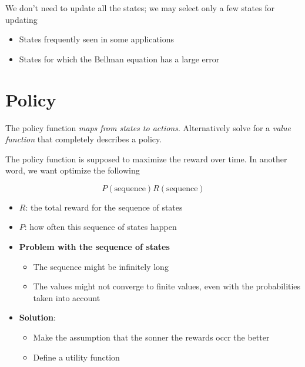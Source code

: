       We don't need to update all the states; we may select only a few states
      for updating

      \begin{itemize}
        \item States frequently seen in some applications
        \item States for which the Bellman equation has a large error
      \end{itemize}

\section{Policy}

  The policy function \emph{maps from states to actions}. Alternatively solve
  for a \emph{value function} that completely describes a policy.

  The policy function is supposed to maximize the reward over time.
  In another word, we want optimize the following

  \begin{equation}
    P\left( \text{sequence} \right) R\left( \text{sequence} \right)
  \end{equation}

  \begin{itemize}
    \item $ R $: the total reward for the sequence of states
    \item $ P $: how often this sequence of states happen
    \item \textbf{Problem with the sequence of states}
    \begin{itemize}
      \item The sequence might be infinitely long
      \item The values might not converge to finite values, even with the
      probabilities taken into account
    \end{itemize}

    \item \textbf{Solution}:
    \begin{itemize}
      \item Make the assumption that the sonner the rewards occr the
      better
      \item Define a utility function
    \end{itemize}
  \end{itemize}


